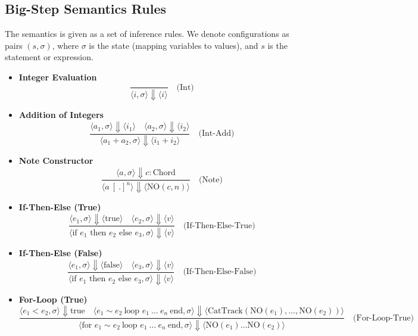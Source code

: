 \documentclass[letterpaper,12pt]{article}
\begin{document}
\subsection{Big-Step Semantics Rules}

The semantics is given as a set of inference rules. We denote configurations as 
pairs \((s, \sigma)\), where \(\sigma\) is the state (mapping variables to values), and \(s\) is the statement or expression.

\begin{itemize}
    \item \textbf{Integer Evaluation}
    \[
    \frac{}{\langle i, \sigma \rangle \Downarrow \langle i \rangle} \quad \text{(Int)}
    \]

    \item \textbf{Addition of Integers}
    \[
    \frac{\langle a_1, \sigma \rangle \Downarrow \langle i_1 \rangle \quad \langle a_2, \sigma \rangle \Downarrow \langle i_2 \rangle}{\langle a_1 + a_2, \sigma \rangle \Downarrow \langle i_1 + i_2 \rangle} \quad \text{(Int-Add)}
    \]

    \item \textbf{Note Constructor}
    \[
    \frac{\langle a, \sigma \rangle \Downarrow c : \text{Chord}}{\langle a \ [\ .]^n \rangle \Downarrow \langle \text{NO}(c, n) \rangle} \quad \text{(Note)}
    \]

    \item \textbf{If-Then-Else (True)}
    \[
    \frac{\langle e_1, \sigma \rangle \Downarrow \langle \text{true} \rangle \quad \langle e_2, \sigma \rangle \Downarrow \langle v \rangle}{\langle \text{if } e_1 \text{ then } e_2 \text{ else } e_3, \sigma \rangle \Downarrow \langle v \rangle} \quad \text{(If-Then-Else-True)}
    \]

    \item \textbf{If-Then-Else (False)}
    \[
    \frac{\langle e_1, \sigma \rangle \Downarrow \langle \text{false} \rangle \quad \langle e_3, \sigma \rangle \Downarrow \langle v \rangle}{\langle \text{if } e_1 \text{ then } e_2 \text{ else } e_3, \sigma \rangle \Downarrow \langle v \rangle} \quad \text{(If-Then-Else-False)}
    \]

    \item \textbf{For-Loop (True)}
    \[
    \frac{\langle e_1 < e_2, \sigma \rangle \Downarrow \text{true} \quad \langle e_1 \sim e_2 \ \text{loop } e_1 \ \dots \ e_n \ \text{end}, \sigma \rangle \Downarrow \langle \text{CatTrack}(\text{NO}(e_1), \dots, \text{NO}(e_2)) \rangle}{\langle \text{for } e_1 \sim e_2 \ \text{loop } e_1 \ \dots \ e_n \ \text{end}, \sigma \rangle \Downarrow \langle \text{NO}(e_1) \dots \text{NO}(e_2) \rangle} \quad \text{(For-Loop-True)}
    \]


\end{itemize}
\end{document}
